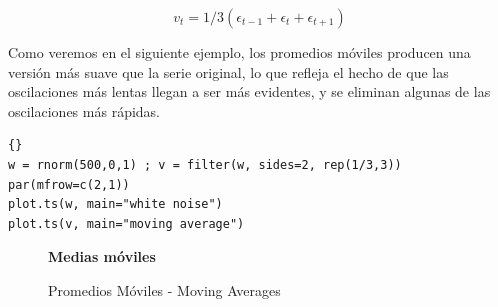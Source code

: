 \begin{equation*}
v_t = 1/3 (\epsilon_{t-1} + \epsilon_t + \epsilon_{t+1})
\end{equation*}

Como veremos en el siguiente ejemplo, los promedios m\'oviles producen una versi\'on m\'as suave que la serie original, lo que refleja el hecho de que las oscilaciones m\'as lentas llegan a ser m\'as evidentes, y se eliminan algunas de las oscilaciones m\'as r\'apidas. 


\begin{lstlisting}[title={‘Código R para generar Moving Averages’},basicstyle=\ttfamily]{}
w = rnorm(500,0,1) ; v = filter(w, sides=2, rep(1/3,3))
par(mfrow=c(2,1))
plot.ts(w, main="white noise")
plot.ts(v, main="moving average")
\end{lstlisting}\label{movingAverage}
\begin{figure}[h]
	\centering
	\textbf{Medias móviles}\par\medskip
	\caption{Promedios Móviles - Moving Averages}\label{figura8}
\end{figure}


